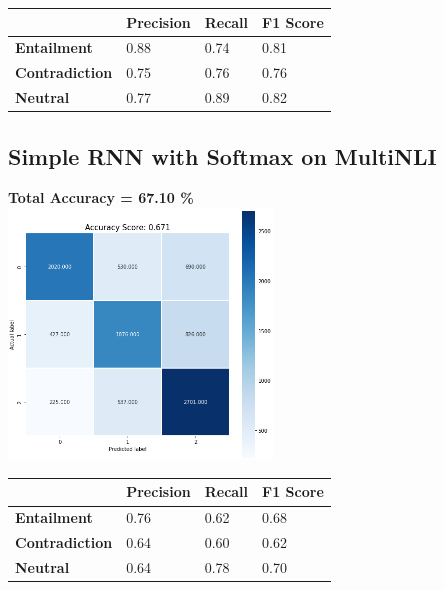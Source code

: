 \documentclass[12pt, conference]{IEEEtran}
\begin{document}
\begin{table}[h]
\begin{tabular}{|l|l|l|l|}
\hline
                       & \textbf{Precision} & \textbf{Recall} & \textbf{F1 Score} \\ \hline
\textbf{Entailment}    & 0.88               & 0.74            & 0.81              \\ \hline
\textbf{Contradiction} & 0.75               & 0.76            & 0.76              \\ \hline
\textbf{Neutral}       & 0.77               & 0.89            & 0.82              \\ \hline
\end{tabular}
\end{table}

\subsection{Simple RNN with Softmax on MultiNLI}
\textbf{Total Accuracy = 67.10 \%}\\
\includegraphics[width=7cm]{images/results/MNLIsoft.png}

\begin{table}[h]
\begin{tabular}{|l|l|l|l|}
\hline
                       & \textbf{Precision} & \textbf{Recall} & \textbf{F1 Score} \\ \hline
\textbf{Entailment}    & 0.76               & 0.62            & 0.68              \\ \hline
\textbf{Contradiction} & 0.64               & 0.60            & 0.62              \\ \hline
\textbf{Neutral}       & 0.64               & 0.78            & 0.70              \\ \hline
\end{tabular}
\end{table}
\end{document}
